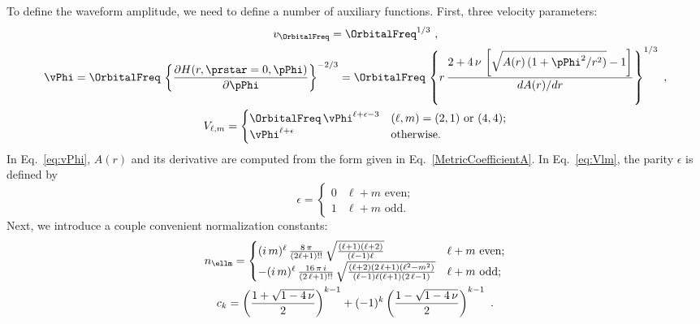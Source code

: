 \documentclass[twoside, aps, prd, letterpaper, noshowpacs, %
amsmath, amssymb, amsfonts, nofootinbib, floatfix, notitlepage]%
{revtex4-1}
\begin{document}
To define the waveform amplitude, we need to define a number of
auxiliary functions.  First, three velocity parameters:
\begin{gather}
  \label{eq:vOrbitalFreq}
  v_{\OrbitalFreq} = \OrbitalFreq^{1/3}~,
  \\ \label{eq:vPhi}
  \vPhi = \OrbitalFreq\, \left\{ \frac{\partial H(r, \prstar=0,
      \pPhi)} {\partial \pPhi} \right\}^{-2/3} = \OrbitalFreq\,
  \left\{ r\, \frac{2 + 4\, \nu\, \left[ \sqrt{A(r)\, (1 +
          \pPhi^{2}/r^{2})} - 1 \right]} {dA(r)/dr} \right\}^{1/3}~,
  \\ \label{eq:Vlm}
  V_{\ell,m} =
  \begin{cases}
    \OrbitalFreq\, \vPhi^{\ell+\epsilon-3} & \text{$(\ell, m) = (2,1)$
      or $(4,4)$;} \\
    \vPhi^{\ell+\epsilon} & \text{otherwise.}
  \end{cases}
\end{gather}
In Eq.~\eqref{eq:vPhi}, $A(r)$ and its derivative are computed from
the \Pade form given in Eq.~\eqref{MetricCoefficientA}.  In
Eq.~\eqref{eq:Vlm}, the parity $\epsilon$ is defined by
\begin{equation}
  \label{eq:DefineParity}
  \epsilon =
  \begin{cases}
    0 & \text{$\ell + m$ even;} \\
    1 & \text{$\ell + m$ odd.}
  \end{cases}
\end{equation}
Next, we introduce a couple convenient normalization constants:
\begin{gather}
  \label{eq:DefineNormalizationConstantn}
  n_{\ellm} =
  \begin{cases}
    (i\, m)^\ell\, \frac{8\, \pi}{(2 \ell+1)!!}\, \sqrt{\frac{(\ell+1)
        (\ell+2)}{(\ell-1) \ell}} & \text{$\ell + m$ even;} \\
    -(i\, m)^\ell\, \frac{16\, \pi\, i}{(2\, \ell+1)!!}\,
    \sqrt{\frac{(\ell+2) (2\, \ell+1) \left(\ell^2-m^2\right)}
      {(\ell-1) \ell (\ell+1) (2\, \ell-1)}} & \text{$\ell + m$ odd;}
  \end{cases}
  \\
  \label{eq:DefineNormalizationConstantc}
  c_{k} = \left( \frac{1 + \sqrt{1-4\, \nu }}{2}
  \right)^{k -1} + (-1)^{k}
  \left(\frac{1-\sqrt{1-4\, \nu}}{2}\right)^{k-1}~.
\end{gather}
\end{document}

